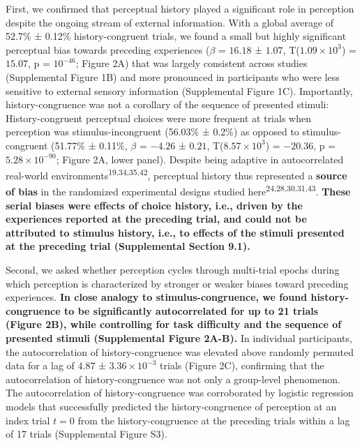 \documentclass[
]{article}
\begin{document}
First, we confirmed that perceptual history played a significant role in
perception despite the ongoing stream of external information. With a
global average of 52.7\% ± 0.12\% history-congruent trials, we found a
small but highly significant perceptual bias towards preceding
experiences (\(\beta\) = \(16.18\) ± \(1.07\),
T(\(\ensuremath{1.09\times 10^{3}}\)) = \(15.07\), p =
\(\ensuremath{10^{-46}}\); Figure 2A) that was largely consistent across
studies (Supplemental Figure 1B) and more pronounced in participants who
were less sensitive to external sensory information (Supplemental Figure
1C). Importantly, history-congruence was not a corollary of the sequence
of presented stimuli: History-congruent perceptual choices were more
frequent at trials when perception was stimulus-incongruent (56.03\% ±
0.2\%) as opposed to stimulus-congruent (51.77\% ± 0.11\%, \(\beta\) =
\(-4.26\) ± \(0.21\), T(\(\ensuremath{8.57\times 10^{3}}\)) =
\(-20.36\), p = \(\ensuremath{5.28\times 10^{-90}}\); Figure 2A, lower
panel). Despite being adaptive in autocorrelated real-world
environments\textsuperscript{19,34,35,42}, perceptual history thus
represented a \textbf{source of bias} in the randomized experimental
designs studied here\textsuperscript{24,28,30,31,43}. \textbf{These
serial biases were effects of choice history, i.e., driven by the
experiences reported at the preceding trial, and could not be attributed
to stimulus history, i.e., to effects of the stimuli presented at the
preceding trial (Supplemental Section 9.1).}

Second, we asked whether perception cycles through multi-trial epochs
during which perception is characterized by stronger or weaker biases
toward preceding experiences. \textbf{In close analogy to
stimulus-congruence, we found history-congruence to be significantly
autocorrelated for up to 21 trials (Figure 2B), while controlling for
task difficulty and the sequence of presented stimuli (Supplemental
Figure 2A-B).} In individual participants, the autocorrelation of
history-congruence was elevated above randomly permuted data for a lag
of \(4.87\) ± \(\ensuremath{3.36\times 10^{-3}}\) trials (Figure 2C),
confirming that the autocorrelation of history-congruence was not only a
group-level phenomenon. The autocorrelation of history-congruence was
corroborated by logistic regression models that successfully predicted
the history-congruence of perception at an index trial \(t = 0\) from
the history-congruence at the preceding trials within a lag of 17 trials
(Supplemental Figure S3).
\end{document}
